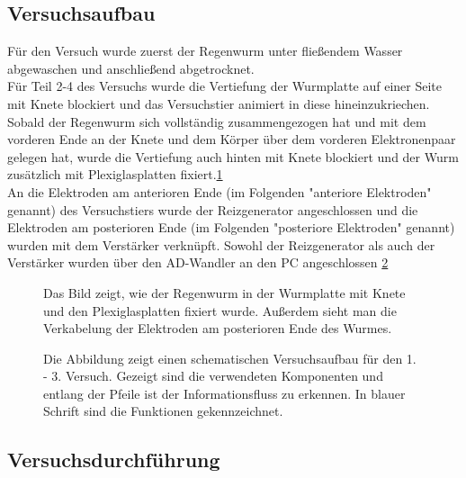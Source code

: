 \documentclass[11pt]{article}
\begin{document}
\subsection{Versuchsaufbau}
Für den Versuch wurde zuerst der Regenwurm unter fließendem Wasser abgewaschen und anschließend abgetrocknet.\\
Für Teil 2-4 des Versuchs wurde die Vertiefung der Wurmplatte auf einer Seite mit Knete blockiert und das Versuchstier animiert in diese hineinzukriechen. Sobald der Regenwurm sich vollständig zusammengezogen hat und mit dem vorderen Ende an der Knete und dem Körper über dem vorderen Elektronenpaar gelegen hat, wurde die Vertiefung auch hinten mit Knete blockiert und der Wurm zusätzlich mit Plexiglasplatten fixiert.\ref{foto} \\
An die Elektroden am anterioren Ende (im Folgenden "{}anteriore Elektroden"{} genannt) des Versuchstiers wurde der Reizgenerator angeschlossen und die Elektroden am posterioren Ende (im Folgenden "{}posteriore Elektroden"{} genannt) wurden mit dem Verstärker verknüpft. Sowohl der Reizgenerator als auch der Verstärker wurden über den AD-Wandler an den PC angeschlossen \ref{schema}
\begin{figure}[H]
\caption{Das Bild zeigt, wie der Regenwurm in der Wurmplatte mit Knete und den Plexiglasplatten fixiert wurde. Außerdem sieht man die Verkabelung der Elektroden am posterioren Ende des Wurmes. }
\label{foto}
\end{figure}
\begin{figure}[H]
\caption{Die Abbildung zeigt einen schematischen Versuchsaufbau für den 1. - 3. Versuch. Gezeigt sind die verwendeten Komponenten und entlang der Pfeile ist der Informationsfluss zu erkennen. In blauer Schrift sind die Funktionen gekennzeichnet. }
\label{schema}
\end{figure}


\subsection{Versuchsdurchführung}
\end{document}
